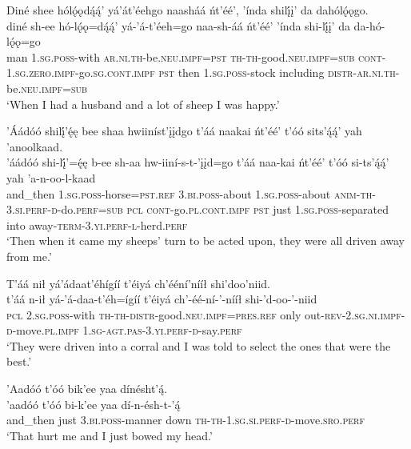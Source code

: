 \ea\label{ex:text8-1-1}
Diné shee hólǫ́ǫdą́ą́’ yá’át’éehgo naasháá ńt’éé’, ’índa shilį́į’ da dahólǫ́ǫgo.\\
\gll diné	sh-ee	hó-lǫ́ǫ=dą́ą́’	yá-’á-t’éeh=go	naa-sh-áá	ńt’éé’	’índa	shi-lį́į’	da	da-hó-lǫ́ǫ=go\\
     man	1.\textsc{sg}.\textsc{poss}-with	\textsc{ar}.\textsc{ni}.\textsc{th}-be.\textsc{neu}.\textsc{impf}=\textsc{pst}	\textsc{th}-\textsc{th}-good.\textsc{neu}.\textsc{impf}=\textsc{sub}	\textsc{cont}-1.\textsc{sg}.\textsc{zero}.\textsc{impf}-go.\textsc{sg}.\textsc{cont}.\textsc{impf}	\textsc{pst}	then	1.\textsc{sg}.\textsc{poss}-stock	including	\textsc{distr}-\textsc{ar}.\textsc{ni}.\textsc{th}-be.\textsc{neu}.\textsc{impf}=\textsc{sub}\\
\glt `When I had a husband and a lot of sheep I was happy.'
\z

\ea\label{ex:text8-1-2}
’Áádóó shilį́’ę́ę bee shaa hwiiníst’įįdgo t’áá naakai ńt’éé’ t’óó sits’ą́ą́’ yah ’anoolkaad.\\
\gll ’áádóó	shi-lį́’=ę́ę	b-ee	sh-aa	hw-iiní-s-t-’įįd=go	t’áá	naa-kai	ńt’éé’	t’óó	si-ts’ą́ą́’	yah	’a-n-oo-l-kaad\\
     and\_then	1.\textsc{sg}.\textsc{poss}-horse=\textsc{pst}.\textsc{ref}	3.\textsc{bi}.\textsc{poss}-about	1.\textsc{sg}.\textsc{poss}-about	\textsc{anim}-\textsc{th}-3.\textsc{si}.\textsc{perf}-\textsc{d}-do.\textsc{perf}=\textsc{sub}	\textsc{pcl}	\textsc{cont}-go.\textsc{pl}.\textsc{cont}.\textsc{impf}	\textsc{pst}	just	1.\textsc{sg}.\textsc{poss}-separated	into	away-\textsc{term}-3.\textsc{yi}.\textsc{perf}-\textsc{l}-herd.\textsc{perf}\\
\glt `Then when it came my sheeps' turn to be acted upon, they were all driven away from me.'
\z

\ea\label{ex:text8-1-3}
T’áá nił yá’ádaat’éhígíí t’éiyá ch’ééní’nííł shi’doo’niid.\\
\gll t’áá	n-ił	yá-’á-daa-t’éh=ígíí	t’éiyá	ch’-éé-ní-’-nííł	shi-’d-oo-’-niid\\
     \textsc{pcl}	2.\textsc{sg}.\textsc{poss}-with	\textsc{th}-\textsc{th}-\textsc{distr}-good.\textsc{neu}.\textsc{impf}=\textsc{pres}.\textsc{ref}	only	out-\textsc{rev}-2.\textsc{sg}.\textsc{ni}.\textsc{impf}-\textsc{d}-move.\textsc{pl}.\textsc{impf}	1.\textsc{sg}-\textsc{agt}.\textsc{pas}-3.\textsc{yi}.\textsc{perf}-\textsc{d}-say.\textsc{perf}\\
\glt `They were driven into a corral and I was told to select the ones that were the best.'
\z

\ea\label{ex:text8-1-4}
’Aadóó t’óó bik’ee yaa dínésht’ą́.\\
\gll ’aadóó	t’óó	bi-k’ee	yaa	dí-n-ésh-t-’ą́\\
     and\_then	just	3.\textsc{bi}.\textsc{poss}-manner	down	\textsc{th}-\textsc{th}-1.\textsc{sg}.\textsc{si}.\textsc{perf}-\textsc{d}-move.\textsc{sro}.\textsc{perf}\\
\glt `That hurt me and I just bowed my head.'
\z

